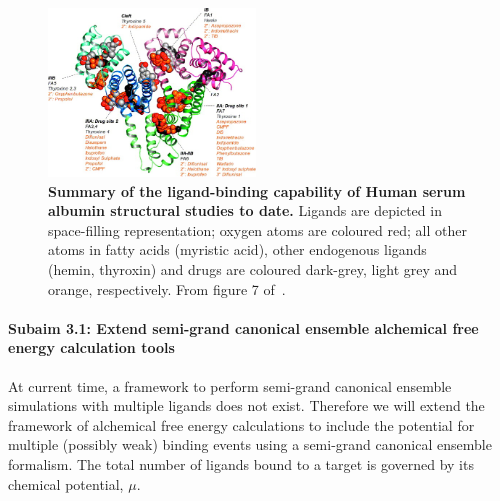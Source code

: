 \documentclass[10pt,final]{article}
\newcommand{\subsubsubsection}[1]{\paragraph*{#1}}
\begin{document}

\begin{figure}
	\centering	
	\includegraphics[width=0.49\textwidth]{figures/hsa_fig7_ghuman2005.jpg}
	\caption{\textbf{Summary of the ligand-binding capability of Human serum albumin structural studies to date.} Ligands are depicted in space-filling representation; oxygen atoms are coloured red; all other atoms in fatty acids (myristic acid), other endogenous ligands (hemin, thyroxin) and drugs are coloured dark-grey, light grey and orange, respectively. From figure 7 of~\cite{Ghuman2005a}.}
	\label{figure:albumin}
\end{figure} 

\subsubsubsection{Subaim 3.1: Extend semi-grand canonical ensemble alchemical free energy calculation tools}
At current time, a framework to perform semi-grand canonical ensemble simulations with multiple ligands does not exist. Therefore we will extend the framework of alchemical free energy calculations to include the potential for multiple (possibly weak) binding events using a semi-grand canonical ensemble formalism. 
The total number of ligands bound to a target is governed by its chemical potential, $\mu$. 
\end{document}
